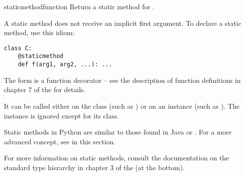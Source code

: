 \begin{funcdesc}{staticmethod}{function}
  Return a static method for .

  A static method does not receive an implicit first argument.
  To declare a static method, use this idiom:

\begin{verbatim}
class C:
    @staticmethod
    def f(arg1, arg2, ...): ...
\end{verbatim}

  The  form is a function decorator -- see the description
  of function definitions in chapter 7 of the
   for details.

  It can be called either on the class (such as ) or on an
  instance (such as ).  The instance is ignored except
  for its class.

  Static methods in Python are similar to those found in Java or \Cpp.
  For a more advanced concept, see  in this
  section.
  
  For more information on static methods, consult the documentation on the
  standard type hierarchy in chapter 3 of the
   (at the bottom).
\end{funcdesc}

